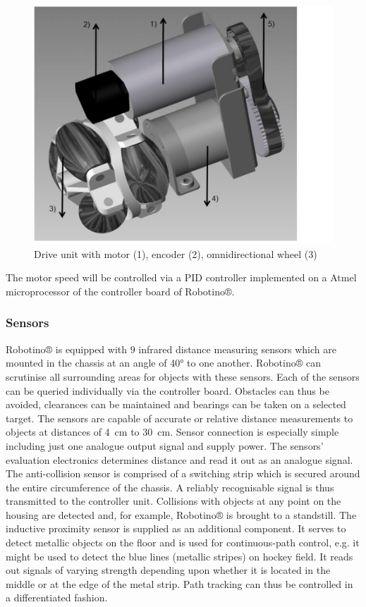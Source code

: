 \documentclass[12pt,twoside]{article}
\begin{document}
\begin{appendix}
\begin{figure}[tbh]
\centering
\includegraphics{driveunit.png}
\caption{Drive unit with motor (1), encoder (2), omnidirectional wheel
(3)}
\label{apx:fig:driveunit}
\end{figure}

The motor speed will be controlled via a PID controller implemented on
a Atmel microprocessor of the controller board of Robotino®.

\subsubsection{Sensors}

Robotino® is equipped with 9 infrared distance measuring sensors which
are mounted in the chassis at an angle of \ang{40} to one
another. Robotino® can scrutinise all surrounding areas for objects
with these sensors.  Each of the sensors can be queried individually
via the controller board. Obstacles can thus be avoided, clearances
can be maintained and bearings can be taken on a selected target. The
sensors are capable of accurate or relative distance measurements to
objects at distances of \SI{4}{\centi\metre} to
\SI{30}{\centi\metre}. Sensor connection is especially simple
including just one analogue output signal and supply power. The
sensors’ evaluation electronics determines distance and read it out as
an analogue signal.  The anti-collision sensor is comprised of a
switching strip which is secured around the entire circumference of
the chassis. A reliably recognisable signal is thus transmitted to the
controller unit.  Collisions with objects at any point on the housing
are detected and, for example, Robotino® is brought to a
standstill. The inductive proximity sensor is supplied as an
additional component. It serves to detect metallic objects on the
floor and is used for continuous-path control, e.g. it might be used
to detect the blue lines (metallic stripes) on hockey field. It reads
out signals of varying strength depending upon whether it is located
in the middle or at the edge of the metal strip. Path tracking can
thus be controlled in a differentiated fashion.


\end{appendix}
\end{document}
